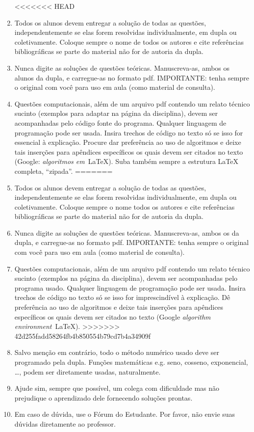 \documentclass{article}
\begin{document}
\begin{enumerate}
 
<<<<<<< HEAD
 \item Todos os alunos devem entregar a solução de todas as questões, independentemente se elas forem resolvidas individualmente, em dupla ou coletivamente. Coloque sempre o nome de todos os autores e cite referências bibliográficas se parte do material não for de autoria da dupla. 
 \item Nunca digite as soluções de questões teóricas. Manuscreva-as, ambos os alunos da dupla, e carregue-as no  formato pdf. IMPORTANTE: tenha sempre o original com você para uso em aula (como material de consulta).
 \item Questões computacionais, além de um arquivo pdf contendo um relato técnico sucinto (exemplos para adaptar na página da disciplina), devem ser acom\-panha\-das pelo código fonte do programa. Qualquer linguagem de programação pode ser usada. Insira trechos de código no texto só se isso for essencial à explicação. Procure dar preferência ao uso de algoritmos e deixe tais inserções para apêndices específicos os quais devem ser citados no texto (Google: {\it algoritmos em}\, \LaTeX). Suba também sempre a estrutura \LaTeX\, completa, ``zipada''.
=======
 \item Todos os alunos devem entregar a solução de todas as questões, independentemente se elas forem resolvidas individualmente, em dupla ou coletivamente. Coloque sempre o nome todos os autores e cite referências bibliográficas se parte do material não for de autoria da dupla. 
 \item Nunca digite as soluções de questões teóricas. Manuscreva-as, ambos os da dupla, e carregue-as no  formato pdf. IMPORTANTE: tenha sempre o original com você para uso em aula (como material de consulta).
 \item Questões computacionais, além de um arquivo pdf contendo um relato técnico sucinto (exemplos na página da disciplina), devem ser acom\-panha\-das pelo programa usado. Qualquer linguagem de programação pode ser usada. Insira trechos de código no texto só se isso for imprescindível à explicação. Dê preferência ao uso de algoritmos e deixe tais inserções para apêndices específicos os quais devem ser citados no texto (Google {\it algorithm environment}\, \LaTeX).
>>>>>>> 42d255fadd58264fb4b850554b79cd7b4a34909f
 \item Salvo menção em contrário, todo o método numérico usado deve ser programado pela dupla. Funções matemáticas e.g. seno, cosseno, exponencial, \dots, podem ser diretamente usadas, naturalmente.
 \item Ajude sim, sempre que possível, um colega com dificuldade mas  não preju\-dique o aprendizado dele fornecendo soluções prontas.
 \item Em caso de dúvida, use o Fórum do Estudante. Por favor, não envie suas dúvidas diretamente ao professor.
\end{enumerate}
\end{document}

